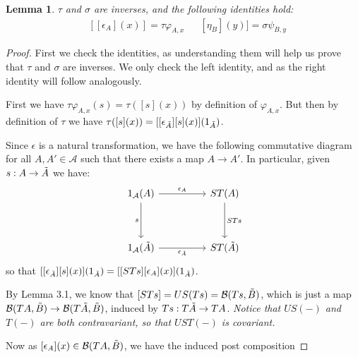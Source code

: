 \documentclass[12pt,a4paper]{article}
\newtheorem{lemma}{Lemma}[section] %
\def\HomB{\ensuremath\mathcal{B}}
\def\t{\ensuremath\tilde}
\begin{document}
\begin{lemma}
	$\tau$ and $\sigma$ are inverses, and the following identities hold:
	\begin{align*}
		&[[\epsilon_A](x)] = \tau \varphi_{A,x}& & [\eta_B](y)]= \sigma \psi_{B,y}
	\end{align*}
\end{lemma}
\begin{proof}
	First we check the identities, as understanding them will help us prove that $\tau$ and $\sigma$ are inverses. We only check the left identity, and as the right identity will follow analogously. 
	
	First we have $\tau \varphi_{A,x}(s) = \tau([s](x))$ by definition of $\varphi_{A,x}$. But then by definition of $\tau$ we have $\tau([s](x)) = [[\epsilon_{\t A}][s](x)](1_{\t A})$. 
	
	Since $\epsilon$ is a natural transformation, we have the following commutative diagram for all $A, A' \in \mathcal{A}$ such that there exists a map $A \to A'$. In particular, given $s: A \to \t A$ we have:
\[\begin{tikzcd}
	{1_\mathcal{A}(A)} && {ST(A)} \\
	\\
	{1_\mathcal{A}(\t A)} && {ST(\t A)}
	\arrow["{\epsilon_A}", from=1-1, to=1-3]
	\arrow["s"', from=1-1, to=3-1]
	\arrow["STs", from=1-3, to=3-3]
	\arrow["{\epsilon_{\t A}}"', from=3-1, to=3-3]
\end{tikzcd}\]
so that $[[\epsilon_{\t A}][s](x)](1_{\t A}) = [[STs][\epsilon_A](x)](1_{\t A})$. 

By Lemma 3.1, we know that $[STs] = US(Ts)  = \HomB(Ts, \t B)$, which is just a map  $\HomB(TA, \t B) \to \HomB(T\t A, \t B)$, induced by $Ts: T\t A \to TA$. \emph{Notice that $US(-)$ and $T(-)$ are both contravariant, so that $UST(-)$ is covariant. }

Now as  $[\epsilon_A](x) \in \HomB(TA, \t B)$, we have the induced post composition


\end{proof}
\end{document}
